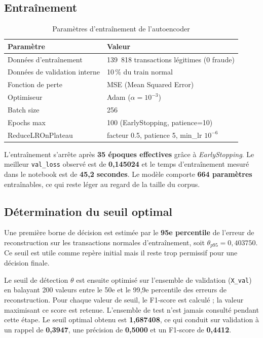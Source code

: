 \documentclass[12pt,a4paper,twoside]{report}
\begin{document}
\subsection{Entraînement}

\begin{table}[H]
\centering
\caption{Paramètres d'entraînement de l'autoencoder}
\label{tab:ae_training}
\begin{tabular}{ll}
\toprule
\textbf{Paramètre} & \textbf{Valeur} \\
\midrule
Données d'entraînement & 139~818 transactions légitimes (0 fraude) \\
Données de validation interne & 10\,\% du train normal \\
Fonction de perte & MSE (Mean Squared Error) \\
Optimiseur & Adam ($\alpha = 10^{-3}$) \\
Batch size & 256 \\
Epochs max & 100 (EarlyStopping, patience=10) \\
ReduceLROnPlateau & facteur 0.5, patience 5, min\_lr $10^{-6}$ \\
\bottomrule
\end{tabular}
\end{table}

L'entraînement s'arrête après \textbf{35 époques effectives} grâce à \textit{EarlyStopping}. Le meilleur \texttt{val\_loss} observé est de \textbf{0,145024} et le temps d'entraînement mesuré dans le notebook est de \textbf{45,2 secondes}. Le modèle comporte \textbf{664 paramètres} entraînables, ce qui reste léger au regard de la taille du corpus.

\subsection{Détermination du seuil optimal}

Une première borne de décision est estimée par le \textbf{95e percentile} de l'erreur de reconstruction sur les transactions normales d'entraînement, soit \textbf{$\theta_{p95}=0,403750$}. Ce seuil est utile comme repère initial mais il reste trop permissif pour une décision finale.

Le seuil de détection $\theta$ est ensuite optimisé sur l'ensemble de validation (\texttt{X\_val}) en balayant 200 valeurs entre le 50e et le 99,9e percentile des erreurs de reconstruction. Pour chaque valeur de seuil, le F1-score est calculé ; la valeur maximisant ce score est retenue. L'ensemble de test n'est jamais consulté pendant cette étape. Le seuil optimal obtenu est \textbf{1,687408}, ce qui conduit sur validation à un rappel de \textbf{0,3947}, une précision de \textbf{0,5000} et un F1-score de \textbf{0,4412}.
\end{document}
